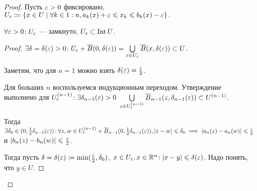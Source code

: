 \begin{proof}
    Пусть $\varepsilon > 0$ фиксировано,  $U_{\varepsilon} \coloneqq \left\{ x \in U \mid \forall k \in 1:n, a_k(x) + \varepsilon \leqslant x_k \leqslant b_k(x) - \varepsilon \right\}. $ 
    \begin{statement}
        $\forall \varepsilon > 0\!: U_{\varepsilon}$ --- замкнуто, $U_{\varepsilon} \subset \operatorname{Int} U$.
    \end{statement}
    \begin{proof}
        $\exists \delta = \delta(\varepsilon) > 0\!: U_{\varepsilon} + \overline{B}(0, \delta(\varepsilon)) = \bigcup\limits_{x \in U_{\varepsilon}} \overline{B}(x, \delta(\varepsilon)) \subset U$.

        Заметим, что для $n = 1$ можно взять $\delta(\varepsilon) = \frac{\varepsilon}{2}$.
        
        Для больших $n$ воспользуемся индукционным переходом. Утверждение выполнено для  $U^{(n-1)}_{\varepsilon}\!: \exists \delta_{n-1}(\varepsilon) > 0\ \bigcup\limits_{z \in U_{\varepsilon}^{(n-1)}} \overline{B}_{n-1}(z, \delta_{n-1}(\varepsilon)) \subset U^{(n-1)}$.

        Тогда $\exists \delta_0 \in (0, \frac{1}{2}\delta_{n-1}(\varepsilon))\!: \forall z, w \in U_{\varepsilon}^{(n-1)} + \overline{B}_{n-1}(0, \frac{1}{2}\delta_{n-1}(\varepsilon)), |z-w| \leqslant \delta_0 \implies |a_n(z) - a_n(w)| \leqslant \frac{\varepsilon}{2}$ и $|b_n(z) - b_n(w)| \leqslant \frac{\varepsilon}{2}$.

        Тогда пусть $\delta = \delta(\varepsilon) \coloneqq \min(\frac{\varepsilon}{2}, \delta_0)$, $x \in U_{\varepsilon}, x \in \mathbb{R}^n\!: |x-y| \leqslant \delta(\varepsilon)$. Надо понять, что $y \in U$.


\end{proof}
\end{proof}
